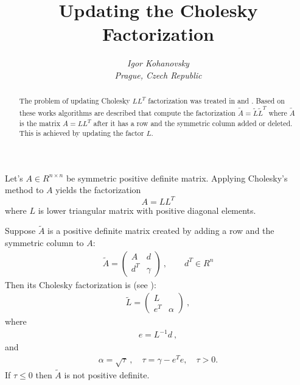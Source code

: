 \documentclass[12pt, a4paper, notitlepage]{article}
\begin{document}
\author{\small \sl
    Igor Kohanovsky \\
\small \sl   Prague, Czech Republic
}
\title{Updating the Cholesky Factorization}
\date{}
\maketitle
\begin{abstract}
   The problem of updating Cholesky $L L^T$ factorization was treated in \cite{liu81} and \cite{coleman89}. Based on these works algorithms are described that compute the factorization $\tilde A = \tilde L \tilde L^T$ where $\tilde A$ is the matrix $A = L L^T$ after it has a row and the symmetric column added or deleted. This is achieved by updating the factor $L$.
\end{abstract}

Let's $A \in R^{n \times n}$ be symmetric positive definite matrix.
Applying Cholesky's method to $A$ yields the factorization $$A = L L^T$$ where $L$ is lower triangular matrix with positive diagonal elements.

Suppose $\tilde A$ is a positive definite matrix created by adding a row and the symmetric column to $A$:
\begin{eqnarray*}
    \tilde A = \left( \begin{array}{cc}
       A & d \\
       d^T & \gamma
      \end{array}
      \right) \ , \qquad d^T  \in R^n 
\end{eqnarray*}
Then its Cholesky factorization is (see \cite{liu81}):
\begin{eqnarray*}
    \tilde L = \left( \begin{array}{cc}
       L  \\
       e^T & \alpha
      \end{array}
      \right) \ ,
\end{eqnarray*}
where 
\begin{eqnarray*}
     e = L^{-1} d \ ,
\end{eqnarray*}
and
\begin{eqnarray*}
    \alpha = \sqrt{ \tau } \ , \quad \tau = \gamma - e^T e, \quad \tau > 0. 
\end{eqnarray*}
If $\tau \le 0$ then $\tilde A$ is not positive definite.
\end{document}
